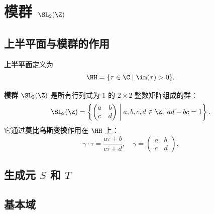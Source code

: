 \chapter{模群 $\SL_2(\Z)$}
\label{ch:modular-group}

\section{上半平面与模群的作用}

\begin{definition}[上半平面]
\textbf{上半平面}定义为
\[
  \HH = \{ \tau \in \C \mid \im(\tau) > 0 \}.
\]
\end{definition}

\begin{definition}[模群]
\textbf{模群} $\SL_2(\Z)$ 是所有行列式为 $1$ 的 $2 \times 2$ 整数矩阵组成的群：
\[
  \SL_2(\Z) = \left\{
    \begin{pmatrix} a & b \\ c & d \end{pmatrix}
    \;\middle|\; a, b, c, d \in \Z,\; ad - bc = 1
  \right\}.
\]
它通过\textbf{莫比乌斯变换}作用在 $\HH$ 上：
\[
  \gamma \cdot \tau = \frac{a\tau + b}{c\tau + d},
  \quad \gamma = \begin{pmatrix} a & b \\ c & d \end{pmatrix}.
\]
\end{definition}

\section{生成元 $S$ 和 $T$}


\section{基本域}

